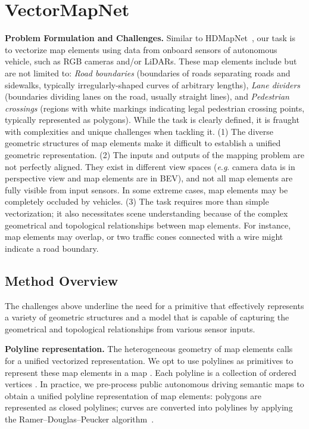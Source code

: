 \documentclass{article}
\newcommand{\eg}{\textit{e}.\textit{g}. }
\theoremstyle{plain}
\theoremstyle{definition}
\theoremstyle{remark}
\begin{document}
\section{VectorMapNet}
\label{sec:VectorMapNet}
\noindent\textbf{Problem Formulation and Challenges.}
Similar to HDMapNet~\citep{li2021hdmapnet}, our task is to vectorize map elements using data from onboard sensors of autonomous vehicle, such as RGB cameras and/or LiDARs. These map elements include but are not limited to: \textit{Road boundaries} (boundaries of roads separating roads and sidewalks, typically irregularly-shaped curves of arbitrary lengths), \textit{Lane dividers} (boundaries dividing lanes on the road, usually straight lines), and \textit{Pedestrian crossings} (regions with white markings indicating legal pedestrian crossing points, typically represented as polygons). 
While the task is clearly defined, it is fraught with complexities and unique challenges when tackling it.
(1) The diverse geometric structures of map elements make it difficult to establish a unified geometric representation. 
(2) The inputs and outputs of the mapping problem are not perfectly aligned. They exist in different view spaces (\eg camera data is in perspective view and map elements are in BEV), and not all map elements are fully visible from input sensors. In some extreme cases, map elements may be completely occluded by vehicles. 
(3) The task requires more than simple vectorization; it also necessitates scene understanding because of the complex geometrical and topological relationships between map elements. For instance, map elements may overlap, or two traffic cones connected with a wire might indicate a road boundary.

\subsection{Method Overview} 
\label{sec:model_overview}
The challenges above underline the need for a primitive that  effectively represents a variety of geometric structures and a model that is capable of capturing the geometrical and topological relationships from various sensor inputs.

\noindent\textbf{Polyline representation.}
The heterogeneous geometry of map elements calls for a unified vectorized representation. We opt to use  polylines  as primitives to represent these map elements in a map . Each polyline  is a collection of  ordered vertices . In practice, we pre-process public autonomous driving semantic maps to obtain a unified polyline representation of map elements: polygons are represented as closed polylines; curves are converted into polylines by applying the Ramer–Douglas–Peucker algorithm~\citep{Ramer1972AnIP}.
\end{document}

